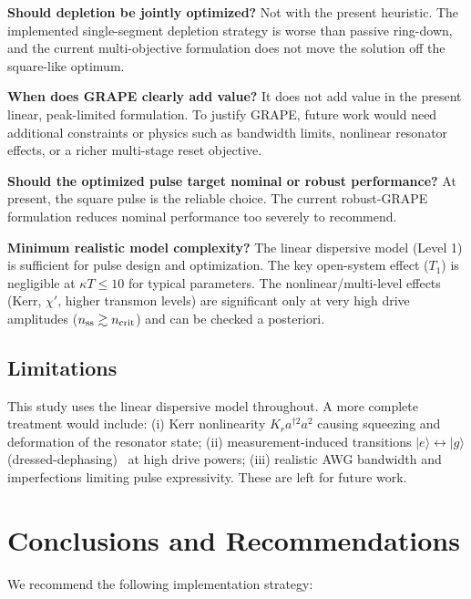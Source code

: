 \documentclass[twocolumn,prl,aps,floatfix]{revtex4-2}
\begin{document}
\textbf{Should depletion be jointly optimized?}
Not with the present heuristic.  The implemented single-segment depletion strategy is worse
than passive ring-down, and the current multi-objective formulation does not move the
solution off the square-like optimum.

\textbf{When does GRAPE clearly add value?}
It does not add value in the present linear, peak-limited formulation.  To justify GRAPE,
future work would need additional constraints or physics such as bandwidth limits,
nonlinear resonator effects, or a richer multi-stage reset objective.

\textbf{Should the optimized pulse target nominal or robust performance?}
At present, the square pulse is the reliable choice.  The current robust-GRAPE formulation
reduces nominal performance too severely to recommend.

\textbf{Minimum realistic model complexity?}
The linear dispersive model (Level 1) is sufficient for pulse design and optimization.
The key open-system effect ($T_1$) is negligible at $\kappa T \leq 10$ for typical parameters.
The nonlinear/multi-level effects (Kerr, $\chi'$, higher transmon levels) are significant
only at very high drive amplitudes ($n_{\rm ss} \gtrsim n_{\rm crit}$) and can be checked
a posteriori.

\subsection{Limitations}

This study uses the linear dispersive model throughout.  A more complete treatment would
include: (i) Kerr nonlinearity $K_r a^{\dagger 2} a^2$ causing squeezing and deformation
of the resonator state; (ii) measurement-induced transitions
$|e\rangle \leftrightarrow |g\rangle$ (dressed-dephasing)~\cite{boissonneault2010dispersive}
at high drive powers; (iii) realistic AWG bandwidth and imperfections limiting pulse
expressivity.  These are left for future work.

\section{Conclusions and Recommendations}

We recommend the following implementation strategy:
\end{document}
